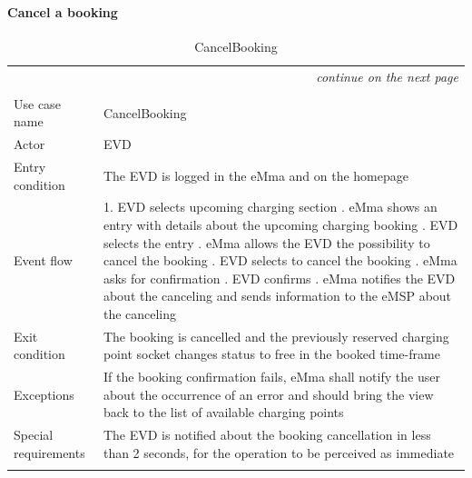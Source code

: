 \paragraph{Cancel a booking}
\begin{center}
    \begin{longtable}{p{4cm} p{11cm}}
    \multicolumn{2}{r}{\itshape{continue on the next page}}\\
    \endfoot 
    \\
    \endlastfoot
    \hline
     Use case name &  CancelBooking\\
     \hline
     Actor & EVD \\
     \hline
     Entry condition &   The EVD is logged in the eMma and on the homepage\\
     \hline
     Event flow &
        1. EVD selects upcoming charging section \newline
        2. eMma shows an entry with details about the upcoming charging booking \newline
        3. EVD selects the entry \newline
        4. eMma allows the EVD the possibility to cancel the booking \newline
        5. EVD selects to cancel the booking \newline
        6. eMma asks for confirmation \newline
        7. EVD confirms \newline
        8. eMma notifies the EVD about the canceling and sends information to the eMSP about the canceling\\
     \hline
     Exit condition &  The booking is cancelled and the previously reserved charging point socket changes status to free in the booked time-frame\\
     \hline
     Exceptions &
        If the booking confirmation fails, eMma shall notify the user about the occurrence of an error and should bring the view back to the list of available charging points
     \\
     \hline
     Special requirements & 
        The EVD is notified about the booking cancellation in less than 2 seconds, for the operation to be perceived as immediate\\
     \hline
    \caption{CancelBooking}
    \label{tab:CancelBooking}
    \end{longtable}
\end{center}

